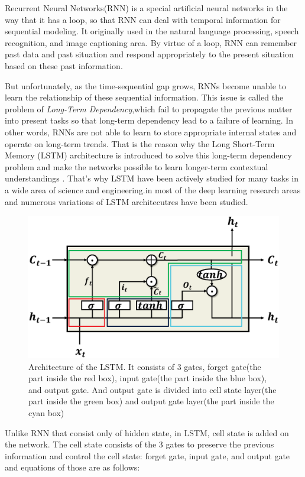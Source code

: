 \documentclass{ieeeaccess}
\begin{document}
Recurrent Neural Networks(RNN) is a special artificial neural networks in the way that it has a loop, so that RNN can deal with temporal information for sequential modeling. It originally used in the natural language processing, speech recognition, and image captioning area. By virtue of a loop, RNN can remember past data and past situation and respond appropriately to the present situation based on these past information. 

But unfortunately, as the time-sequential gap grows, RNNs become unable to learn the relationship of these sequential information. This issue is called the problem of \textit{Long-Term Dependency},which fail to propagate the previous matter into present tasks so that long-term dependency lead to a failure of learning. In other words, RNNs are not able to learn to store appropriate internal states and operate on long-term trends. That is the reason why the Long Short-Term Memory (LSTM) architecture is introduced to solve this long-term dependency problem and make the networks possible to learn longer-term contextual
understandings \cite{hochreiter1997long}. That's why LSTM have been actively studied for many tasks in a wide area of science and engineering.in most of the deep learning research areas and numerous variations of LSTM architecutres have been studied.

\begin{figure}[h]
	\centering
	\includegraphics[width=.4\textwidth]{image/basic_LSTM_revised}
	\caption{Architecture of the LSTM. It consists of 3 gates, forget gate(the part inside the red box), input gate(the part inside the blue box), and output gate. And output gate is divided into cell state layer(the part inside the green box) and output gate layer(the part inside the cyan box) 
	}
	\label{fig:basic_lstm}
\end{figure}

Unlike RNN that consist only of hidden state, in LSTM, cell state is added on the network. The cell state consists of the 3 gates to preserve the previous information and control the cell state: forget gate, input gate, and output gate and equations of those are as follows:
\end{document}
